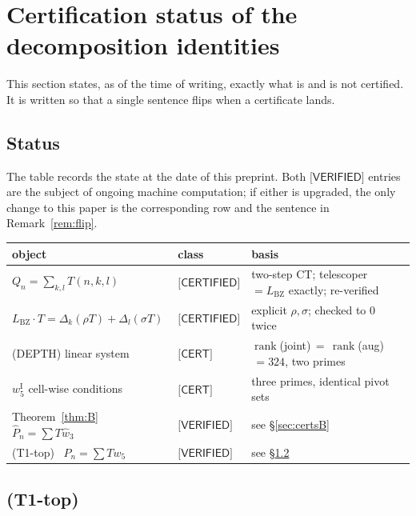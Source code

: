 \documentclass[11pt,reqno]{amsart}
\theoremstyle{plain}
\theoremstyle{definition}
\theoremstyle{remark}
\numberwithin{equation}{section}
\newcommand{\rank}{\operatorname{rank}}
\newcommand{\LBZ}{L_{\mathrm{BZ}}}
\newcommand{\wfive}{w_5}
\newcommand{\wthree}{\hat w_3}
\newcommand{\VERIFIED}{\textsf{[VERIFIED]}}
\newcommand{\CERTIFIED}{\textsf{[CERTIFIED]}}
\newcommand{\CERT}{\textsf{[CERT]}}
\begin{document}
\section{Certification status of the decomposition identities}\label{sec:certs}

This section states, as of the time of writing, exactly what is and is not certified. It is
written so that a single sentence flips when a certificate lands.

\subsection{Status}

The table records the state at the date of this preprint. Both $\VERIFIED$ entries are the
subject of ongoing machine computation; if either is upgraded, the only change to this paper is
the corresponding row and the sentence in Remark~\ref{rem:flip}.

\begin{center}
\begin{tabular}{@{}lll@{}}
\toprule
object & class & basis \\
\midrule
$Q_n=\sum_{k,l}T(n,k,l)$ &$\CERTIFIED$& two-step CT; telescoper $=\LBZ$ exactly; re-verified\\
$\LBZ\cdot T=\Delta_k(\rho T)+\Delta_l(\sigma T)$ &$\CERTIFIED$& explicit $\rho,\sigma$; checked to $0$ twice\\
(DEPTH) linear system &$\CERT$& $\rank$(joint)$\,=\,\rank$(aug)$\,=324$, two primes\\
$w_5^{\mathrm I}$ cell-wise conditions &$\CERT$& three primes, identical pivot sets\\
Theorem~\ref{thm:B} \ $\hat P_n=\sum T\wthree$ &$\VERIFIED$& see \S\ref{sec:certsB}\\
(T1-top) \ $P_n=\sum T\wfive$ &$\VERIFIED$& see \S\ref{sec:certsT1}\\
\bottomrule
\end{tabular}
\end{center}

\subsection{(T1-top)}\label{sec:certsT1}
\end{document}
